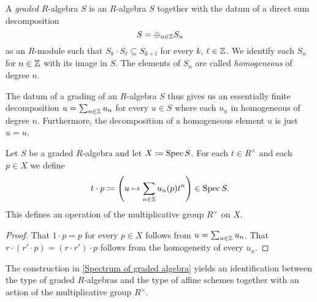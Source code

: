 \begin{definition}
  A \emph{graded} $R$-algebra $S$ is an $R$-algebra $S$ together with the datum of a direct sum decomposition
  \begin{equation*}
    S = \oplus_{n \in \mathbb{Z}} S_n
  \end{equation*}
  as an $R$-module such that $S_k \cdot S_\ell \subseteq S_{k + l}$
  for every $k$, $\ell \in \mathbb{Z}$.  We identify each $S_n$ for $n \in \mathbb{Z}$
  with its image in $S$.  The elements of $S_n$ are called \emph{homogeneous} of degree $n$.
\end{definition}

\begin{remark}
  The datum of a grading of an $R$-algebra $S$ thus gives us an
  essentially finite decomposition $u = \sum_{n \in \mathbb{Z}} u_n$ for every
  $u \in S$ where each $u_n$ in homogeneous of degree $n$.
  Furthermore, the decomposition of a homogeneous element $u$ is just $u = u$.
\end{remark}

\begin{proposition}
  \label{Spectrum of graded algebra}
  Let $S$ be a graded $R$-algebra and let $X \coloneqq \operatorname{Spec} S$.  For each $t \in R^\times$ and each $p \in X$ we define
  \begin{equation*}
    t \cdot p \coloneqq \left(u \mapsto \sum_{n \in \mathbb{Z}} u_n(p) t^n\right) \in \operatorname{Spec} S.
  \end{equation*}
  This defines an operation of the multiplicative group $R^\times$ on $X$.
\end{proposition}

\begin{proof}
  That $1 \cdot p = p$ for every $p \in X$ follows from
  $u = \sum_{n \in \mathbb{Z}} u_n$.  That
  $r \cdot (r' \cdot p) = (r \cdot r') \cdot p$ follows from the
  homogeneity of every $u_n$.
\end{proof}

\begin{theorem}
  The construction in \cref{Spectrum of graded algebra} yields an
  identification between the type of graded $R$-algebras and the type
  of affine schemes together with an action of the multiplicative
  group $R^\times$.
\end{theorem}

